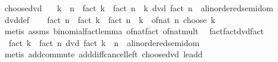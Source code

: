\begin{isabellebody}
\ choose{\isacharunderscore}{\kern0pt}dvd{\isacharcolon}{\kern0pt}\isanewline
\ \ \ {\isachardoublequoteopen}k\ {\isasymle}\ n{\isachardoublequoteclose}\ \ {\isachardoublequoteopen}fact\ k\ {\isacharasterisk}{\kern0pt}\ fact\ {\isacharparenleft}{\kern0pt}n\ {\isacharminus}{\kern0pt}\ k{\isacharparenright}{\kern0pt}\ dvd\ {\isacharparenleft}{\kern0pt}fact\ n\ {\isacharcolon}{\kern0pt}{\isacharcolon}{\kern0pt}\ {\isacharprime}{\kern0pt}a{\isacharcolon}{\kern0pt}{\isacharcolon}{\kern0pt}linordered{\isacharunderscore}{\kern0pt}semidom{\isacharparenright}{\kern0pt}{\isachardoublequoteclose}\isanewline
%
\isadelimproof
\ \ %
\endisadelimproof
%
\isatagproof
{}\isamarkupfalse%
\ dvd{\isacharunderscore}{\kern0pt}def\isanewline
{}\isamarkupfalse%
\isanewline
\ \ \isamarkupfalse%
\ {\isachardoublequoteopen}fact\ n\ {\isacharequal}{\kern0pt}\ fact\ k\ {\isacharasterisk}{\kern0pt}\ fact\ {\isacharparenleft}{\kern0pt}n\ {\isacharminus}{\kern0pt}\ k{\isacharparenright}{\kern0pt}\ {\isacharasterisk}{\kern0pt}\ of{\isacharunderscore}{\kern0pt}nat\ {\isacharparenleft}{\kern0pt}n\ choose\ k{\isacharparenright}{\kern0pt}{\isachardoublequoteclose}\isanewline
\ \ \ \ \isamarkupfalse%
\ {\isacharparenleft}{\kern0pt}metis\ assms\ binomial{\isacharunderscore}{\kern0pt}fact{\isacharunderscore}{\kern0pt}lemma\ of{\isacharunderscore}{\kern0pt}nat{\isacharunderscore}{\kern0pt}fact\ of{\isacharunderscore}{\kern0pt}nat{\isacharunderscore}{\kern0pt}mult{\isacharparenright}{\kern0pt}\ \isanewline
{}\isamarkupfalse%
%
\endisatagproof
{\isafoldproof}%
%
\isadelimproof
\isanewline
%
\endisadelimproof
\isanewline
{}\isamarkupfalse%
\ fact{\isacharunderscore}{\kern0pt}fact{\isacharunderscore}{\kern0pt}dvd{\isacharunderscore}{\kern0pt}fact{\isacharcolon}{\kern0pt}\isanewline
\ \ {\isachardoublequoteopen}fact\ k\ {\isacharasterisk}{\kern0pt}\ fact\ n\ dvd\ {\isacharparenleft}{\kern0pt}fact\ {\isacharparenleft}{\kern0pt}k\ {\isacharplus}{\kern0pt}\ n{\isacharparenright}{\kern0pt}\ {\isacharcolon}{\kern0pt}{\isacharcolon}{\kern0pt}\ {\isacharprime}{\kern0pt}a{\isacharcolon}{\kern0pt}{\isacharcolon}{\kern0pt}linordered{\isacharunderscore}{\kern0pt}semidom{\isacharparenright}{\kern0pt}{\isachardoublequoteclose}\isanewline
%
\isadelimproof
\ \ %
\endisadelimproof
%
\isatagproof
{}\isamarkupfalse%
\ {\isacharparenleft}{\kern0pt}metis\ add{\isachardot}{\kern0pt}commute\ add{\isacharunderscore}{\kern0pt}diff{\isacharunderscore}{\kern0pt}cancel{\isacharunderscore}{\kern0pt}left{\isacharprime}{\kern0pt}\ choose{\isacharunderscore}{\kern0pt}dvd\ le{\isacharunderscore}{\kern0pt}add{}{\isacharparenright}{\kern0pt}%

\end{isabellebody}
